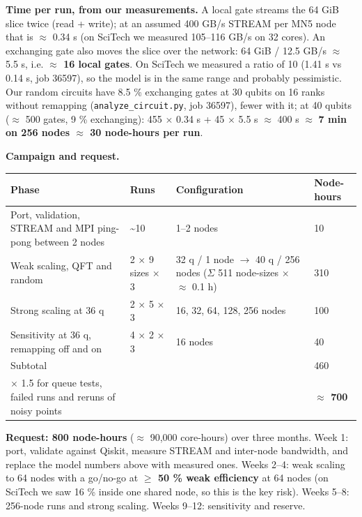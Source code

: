 \documentclass[10pt,a4paper]{article}
\begin{document}
\textbf{Time per run, from our measurements.} A local gate streams the 64 GiB slice twice (read + write); at an assumed 400 GB/s STREAM per MN5 node that is $\approx$ 0.34 s (on SciTech we measured 105--116 GB/s on 32 cores). An exchanging gate also moves the slice over the network: 64 GiB / 12.5 GB/s $\approx$ 5.5 s, i.e. \textbf{$\approx$ 16 local gates}. On SciTech we measured a ratio of 10 (1.41 s vs 0.14 s, job 36597), so the model is in the same range and probably pessimistic. Our random circuits have 8.5 \% exchanging gates at 30 qubits on 16 ranks without remapping (\texttt{analyze\_circuit.py}, job 36597), fewer with it; at 40 qubits ($\approx$ 500 gates, 9 \% exchanging): 455 $\times$ 0.34 s + 45 $\times$ 5.5 s $\approx$ 400 s $\approx$ \textbf{7 min on 256 nodes $\approx$ 30 node-hours per run}.



\textbf{Campaign and request.}



\begin{table}[ht]\centering\small
\begin{tabularx}{\linewidth}{@{}XllX@{}}
\toprule
\textbf{Phase} & \textbf{Runs} & \textbf{Configuration} & \textbf{Node-hours} \\
\midrule
Port, validation, STREAM and MPI ping-pong between 2 nodes & \textasciitilde{}10 & 1--2 nodes & 10 \\
Weak scaling, QFT and random & 2 $\times$ 9 sizes $\times$ 3 & 32 q / 1 node $\rightarrow$ 40 q / 256 nodes ($\Sigma$ 511 node-sizes $\times$ $\approx$ 0.1 h) & 310 \\
Strong scaling at 36 q & 2 $\times$ 5 $\times$ 3 & 16, 32, 64, 128, 256 nodes & 100 \\
Sensitivity at 36 q, remapping off and on & 4 $\times$ 2 $\times$ 3 & 16 nodes & 40 \\
Subtotal &  &  & 460 \\
$\times$ 1.5 for queue tests, failed runs and reruns of noisy points &  &  & \textbf{$\approx$ 700} \\
\bottomrule
\end{tabularx}
\end{table}



\textbf{Request: 800 node-hours} ($\approx$ 90,000 core-hours) over three months. Week 1: port, validate against Qiskit, measure STREAM and inter-node bandwidth, and replace the model numbers above with measured ones. Weeks 2--4: weak scaling to 64 nodes with a go/no-go at \textbf{$\ge$ 50 \% weak efficiency} at 64 nodes (on SciTech we saw 16 \% inside one shared node, so this is the key risk). Weeks 5--8: 256-node runs and strong scaling. Weeks 9--12: sensitivity and reserve.
\end{document}
